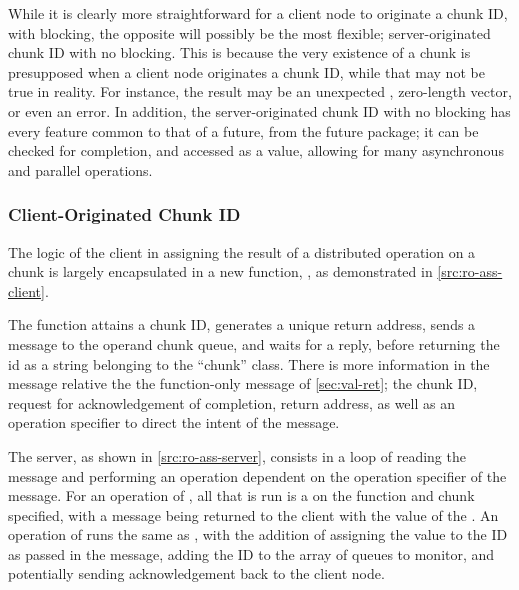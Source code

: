 
While it is clearly more straightforward for a client node to originate a chunk
ID, with blocking, the opposite will possibly be the most flexible;
server-originated chunk ID with no blocking.
This is because the very existence of a chunk is presupposed when a client
node originates a chunk ID, while that may not be true in reality.
For instance, the result may be an unexpected , zero-length
vector, or even an error.
In addition, the server-originated chunk ID with no blocking has every feature
common to that of a future, from the future package; it can be checked for
completion, and accessed as a value, allowing for many asynchronous and
parallel operations.

\subsubsection{Client-Originated Chunk ID}

The logic of the client in assigning the result of a distributed operation on a
chunk is largely encapsulated in a new function, , as
demonstrated in \cref{src:ro-ass-client}.


The function attains a chunk ID, generates a unique return address, sends a
message to the operand chunk queue, and waits for a reply, before returning the
id as a string belonging to the ``chunk'' class.
There is more information in the message relative the the function-only
message of \cref{sec:val-ret}; the chunk ID, request for acknowledgement
of completion, return address, as well as an operation specifier to direct the
intent of the message.

The server, as shown in \cref{src:ro-ass-server}, consists in a loop of
reading the message and performing an operation dependent on the operation
specifier of the message.
For an operation of , all that is run is a  on
the function and chunk specified, with a message being returned to the
client with the value of the .
An operation of  runs the same as , with the
addition of assigning the value to the ID as passed in the message, adding
the ID to the array of queues to monitor, and potentially sending
acknowledgement back to the client node.

